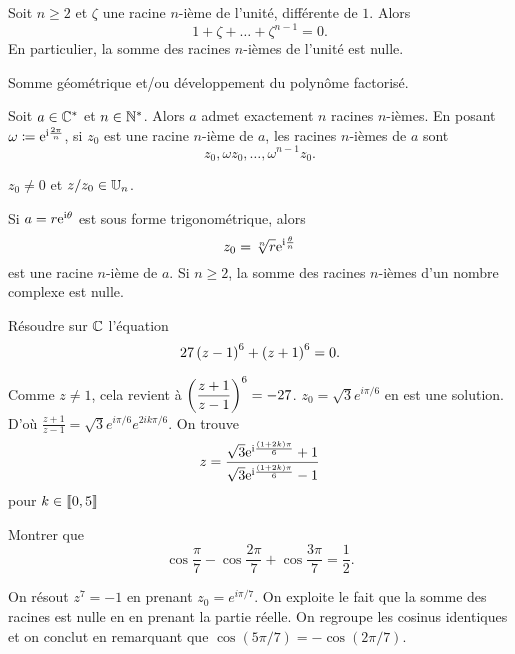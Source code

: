 \documentclass{magnolia}
\begin{document}
\begin{proposition}[utile=-3]
Soit $n\geq 2$ et $\zeta$ une racine $n$-ième de l'unité, différente de $1$.
Alors
\[1+\zeta+\dots+\zeta^{n-1}=0.\]
En particulier, la somme des racines $n$-ièmes de l'unité est nulle.
\end{proposition}

\begin{preuve}
Somme géométrique et/ou développement du polynôme factorisé.
\end{preuve}


\begin{proposition}[utile=-3]
Soit $a\in\mathbb{C}^*$ et $n\in{\mathbb{N}^*}$. Alors $a$ admet exactement $n$ racines $n$-ièmes. En posant $\omega\coloneqq{\rm e}^{{\rm i}\frac{2\pi}{n}}$, si $z_0$ est une racine $n$-ième de $a$, les racines $n$-ièmes de $a$ sont
\[z_0,\omega z_0,\ldots,\omega^{n-1}z_0.\]
\end{proposition}

\begin{preuve}
$z_0\neq 0$ et $z/z_0 \in \U[n]$.

\end{preuve}

\begin{remarques}
\remarque Si $a=r{\rm e}^{{\rm i}\theta}$ est sous forme trigonométrique, alors 
  \[z_0=\sqrt[n]{r}{\rm e}^{{\rm i}\frac{\theta}{n}}\]
  est une racine $n$-ième de $a$.
\remarque Si $n\geq 2$, la somme des racines $n$-ièmes d'un nombre complexe est
  nulle.
\end{remarques}

\begin{exos}
\exo Résoudre sur $\mathbb{C}$ l'équation
  \[27\left(z-1\right)^6+\left(z+1\right)^6=0.\]
  \begin{sol}
  Comme $z\neq 1$, cela revient à $\displaystyle \left(\frac{z+1}{z-1}\right)^6=-27$. $z_0=\sqrt{3}e^{i\pi/6}$ en est une solution. D'où $\frac{z+1}{z-1}=\sqrt{3}e^{i\pi/6}e^{2ik\pi/6}$.
  On trouve
  \[z=\frac{\sqrt{3}{\rm e}^{{\rm i}\frac{(1+2k)\pi}{6}}+1}{\sqrt{3}{\rm e}^{{\rm i}\frac{(1+2k)\pi}{6}}-1}\]
   pour $k\in\left\llbracket 0,5\right\rrbracket$
  \end{sol}
\exo Montrer que
  \[\cos\frac{\pi}{7}-\cos\frac{2\pi}{7}+\cos\frac{3\pi}{7}=\frac{1}{2}.\]
  \begin{sol}
  On résout $z^7=-1$ en prenant $z_0=e^{i\pi/7}$. On exploite le fait que la somme des racines est nulle en en prenant la partie réelle. On regroupe les cosinus identiques et on conclut en remarquant que $\cos(5\pi/7)=-\cos(2\pi/7)$.
  \end{sol}
\end{exos}
\end{document}
